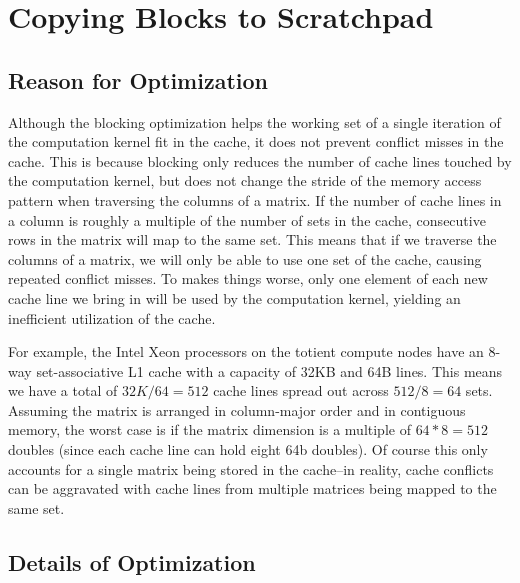 
\section{Copying Blocks to Scratchpad}
\label{sec-opts-copy}

\subsection{Reason for Optimization}

Although the blocking optimization helps the working set of a single
iteration of the computation kernel fit in the cache, it does not prevent
conflict misses in the cache. This is because blocking only reduces the
number of cache lines touched by the computation kernel, but does not
change the stride of the memory access pattern when traversing the columns
of a matrix. If the number of cache lines in a column is roughly a
multiple of the number of sets in the cache, consecutive rows in the
matrix will map to the same set. This means that if we traverse the
columns of a matrix, we will only be able to use one set of the cache,
causing repeated conflict misses. To makes things worse, only one element
of each new cache line we bring in will be used by the computation
kernel, yielding an inefficient utilization of the cache.
\smallskip

For example, the Intel Xeon processors on the totient compute nodes
have an 8-way set-associative L1 cache with a capacity of 32KB and 64B
lines. This means we have a total of $32K/64 = 512$ cache lines spread
out across $512/8 = 64$ sets. Assuming the matrix is arranged in
column-major order and in contiguous memory, the worst case is if the
matrix dimension is a multiple of $64*8 = 512$ doubles (since each cache
line can hold eight 64b doubles). Of course this only accounts for a
single matrix being stored in the cache--in reality, cache conflicts can
be aggravated with cache lines from multiple matrices being mapped to the
same set.
\smallskip

\subsection{Details of Optimization}



